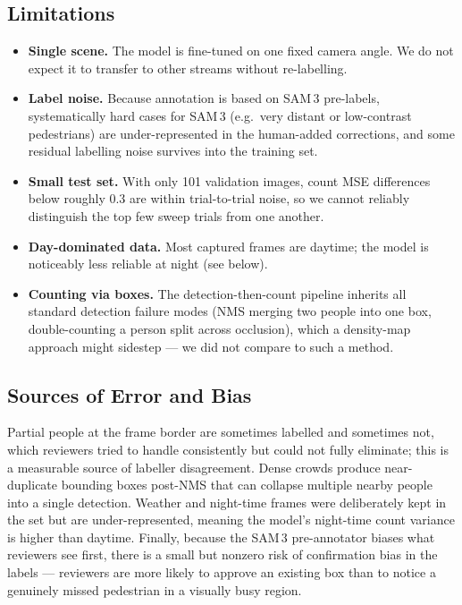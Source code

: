 \documentclass{article}
\begin{document}
\subsection{Limitations}
\begin{itemize}[leftmargin=1.5em]
    \item \textbf{Single scene.} The model is fine-tuned on one
    fixed camera angle. We do not expect it to transfer to other
    streams without re-labelling.
    \item \textbf{Label noise.} Because annotation is based on
    SAM\,3 pre-labels, systematically hard cases for SAM\,3
    (e.g.\ very distant or low-contrast pedestrians) are
    under-represented in the human-added corrections, and some
    residual labelling noise survives into the training set.
    \item \textbf{Small test set.} With only 101 validation
    images, count MSE differences below roughly $0.3$ are within
    trial-to-trial noise, so we cannot reliably distinguish the
    top few sweep trials from one another.
    \item \textbf{Day-dominated data.} Most captured frames are
    daytime; the model is noticeably less reliable at night
    (see below).
    \item \textbf{Counting via boxes.} The detection-then-count
    pipeline inherits all standard detection failure modes (NMS
    merging two people into one box, double-counting a person
    split across occlusion), which a density-map approach might
    sidestep --- we did not compare to such a method.
\end{itemize}

\subsection{Sources of Error and Bias}
Partial people at the frame border are sometimes labelled and
sometimes not, which reviewers tried to handle consistently but
could not fully eliminate; this is a measurable source of
labeller disagreement. Dense crowds produce near-duplicate
bounding boxes post-NMS that can collapse multiple nearby people
into a single detection. Weather and night-time frames were
deliberately kept in the set but are under-represented, meaning
the model's night-time count variance is higher than daytime.
Finally, because the SAM\,3 pre-annotator biases what reviewers
see first, there is a small but nonzero risk of confirmation bias
in the labels --- reviewers are more likely to approve an
existing box than to notice a genuinely missed pedestrian in a
visually busy region.
\end{document}
